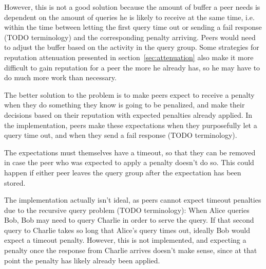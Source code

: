However, this is not a good solution because the amount of buffer a peer needs
is dependent on the amount of queries he is likely to receive at the same time,
i.e. within the time between letting the first query time out or sending a fail
response (TODO terminology) and the corresponding penalty arriving. Peers would
need to adjust the buffer based on the activity in the query group. Some
strategies for reputation attenuation presented in section~\ref{sec:attenuation}
also make it more difficult to gain reputation for a peer the more he already
has, so he may have to do much more work than necessary.

The better solution to the problem is to make peers expect to receive a penalty
when they do something they know is going to be penalized, and make their
decisions based on their reputation with expected penalties already applied. In
the implementation, peers make these expectations when they purposefully let a
query time out, and when they send a fail response (TODO terminology).

The expectations must themselves have a timeout, so that they can be removed in
case the peer who was expected to apply a penalty doesn't do so. This could
happen if either peer leaves the query group after the expectation has been
stored.

The implementation actually isn't ideal, as peers cannot expect timeout
penalties due to the recursive query problem (TODO terminology): When Alice
queries Bob, Bob may need to query Charlie in order to serve the query. If that
second query to Charlie takes so long that Alice's query times out, ideally Bob
would expect a timeout penalty. However, this is not implemented, and expecting
a penalty once the response from Charlie arrives doesn't make sense, since at
that point the penalty has likely already been applied.

